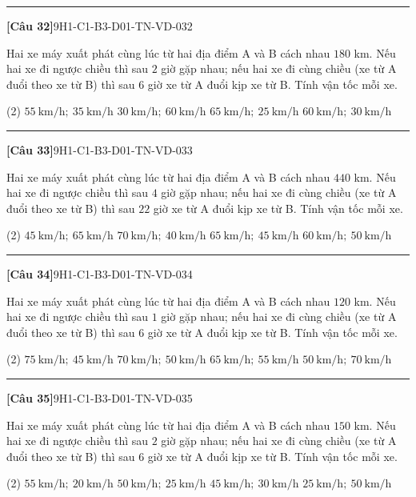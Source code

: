 \documentclass[12pt,a4paper]{article}
\newif\ifloigiai
\newenvironment{cauhoi}[2]{%
  \par\medskip\noindent\rule{\textwidth}{0.4pt}\par\nopagebreak
  \noindent\textbf{[#1]}\hfill{\scriptsize\ttfamily #2}\par\nopagebreak\smallskip}{\par}
\newcommand{\dapan}[1]{\ifloigiai\par\smallskip\noindent\textit{Đáp án:} \textbf{#1}\par\fi}
\begin{document}
\begin{cauhoi}{Câu 32}{9H1-C1-B3-D01-TN-VD-032}
Hai xe máy xuất phát cùng lúc từ hai địa điểm A và B cách nhau $180$ km. Nếu hai xe đi ngược chiều thì sau $2$ giờ gặp nhau; nếu hai xe đi cùng chiều (xe từ A đuổi theo xe từ B) thì sau $6$ giờ xe từ A đuổi kịp xe từ B. Tính vận tốc mỗi xe.
\begin{tasks}(2)
\task $55\ \text{km/h};\ 35\ \text{km/h}$
\task $30\ \text{km/h};\ 60\ \text{km/h}$
\task $65\ \text{km/h};\ 25\ \text{km/h}$
\task $60\ \text{km/h};\ 30\ \text{km/h}$
\end{tasks}
\dapan{D}
\end{cauhoi}
\begin{cauhoi}{Câu 33}{9H1-C1-B3-D01-TN-VD-033}
Hai xe máy xuất phát cùng lúc từ hai địa điểm A và B cách nhau $440$ km. Nếu hai xe đi ngược chiều thì sau $4$ giờ gặp nhau; nếu hai xe đi cùng chiều (xe từ A đuổi theo xe từ B) thì sau $22$ giờ xe từ A đuổi kịp xe từ B. Tính vận tốc mỗi xe.
\begin{tasks}(2)
\task $45\ \text{km/h};\ 65\ \text{km/h}$
\task $70\ \text{km/h};\ 40\ \text{km/h}$
\task $65\ \text{km/h};\ 45\ \text{km/h}$
\task $60\ \text{km/h};\ 50\ \text{km/h}$
\end{tasks}
\dapan{C}
\end{cauhoi}
\begin{cauhoi}{Câu 34}{9H1-C1-B3-D01-TN-VD-034}
Hai xe máy xuất phát cùng lúc từ hai địa điểm A và B cách nhau $120$ km. Nếu hai xe đi ngược chiều thì sau $1$ giờ gặp nhau; nếu hai xe đi cùng chiều (xe từ A đuổi theo xe từ B) thì sau $6$ giờ xe từ A đuổi kịp xe từ B. Tính vận tốc mỗi xe.
\begin{tasks}(2)
\task $75\ \text{km/h};\ 45\ \text{km/h}$
\task $70\ \text{km/h};\ 50\ \text{km/h}$
\task $65\ \text{km/h};\ 55\ \text{km/h}$
\task $50\ \text{km/h};\ 70\ \text{km/h}$
\end{tasks}
\dapan{B}
\end{cauhoi}
\begin{cauhoi}{Câu 35}{9H1-C1-B3-D01-TN-VD-035}
Hai xe máy xuất phát cùng lúc từ hai địa điểm A và B cách nhau $150$ km. Nếu hai xe đi ngược chiều thì sau $2$ giờ gặp nhau; nếu hai xe đi cùng chiều (xe từ A đuổi theo xe từ B) thì sau $6$ giờ xe từ A đuổi kịp xe từ B. Tính vận tốc mỗi xe.
\begin{tasks}(2)
\task $55\ \text{km/h};\ 20\ \text{km/h}$
\task $50\ \text{km/h};\ 25\ \text{km/h}$
\task $45\ \text{km/h};\ 30\ \text{km/h}$
\task $25\ \text{km/h};\ 50\ \text{km/h}$
\end{tasks}
\dapan{B}
\end{cauhoi}
\end{document}
